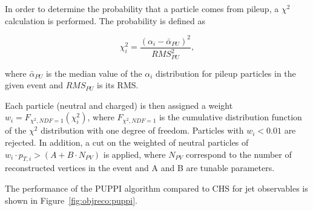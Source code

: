 In order to determine the probability that a particle comes from pileup, a $\chi^{2}$ calculation is performed. The probability is defined as

\begin{equation}
\chi^{2}_{i} = \frac{(\alpha_i -  \bar{\alpha}_{PU})^{2}}{RMS_{PU}^{2}},
\end{equation}

where $\bar{\alpha}_{PU}$ is the median value of the $\alpha_i$ distribution for pileup particles in the given event and $RMS_{PU}$ is its RMS.

Each particle (neutral and charged) is then assigned a weight $w_i = F_{\chi^2,NDF=1}(\chi^2_i)$, where $F_{\chi^2,NDF=1}$ is the cumulative distribution function of the $\chi^2$ distribution with one degree of freedom. Particles with $w_{i}<0.01$ are rejected.
In addition, a cut on the weighted \PT of neutral particles of $w_{i} \cdot p_{T,i} >  (A + B \cdot N_{PV})$ \GeV is applied, where $N_{PV}$ correspond to the number of reconstructed vertices in the event and A and B are tunable parameters. 

The performance of the PUPPI algorithm compared to CHS for jet observables is shown in Figure~\ref{fig:objreco:puppi}.

